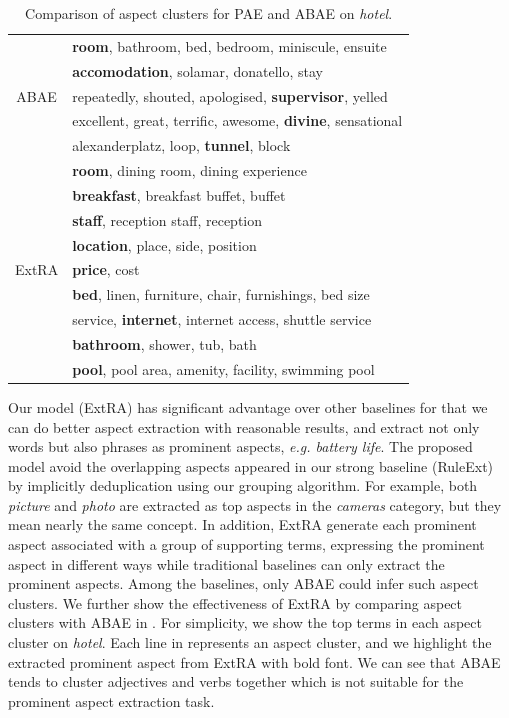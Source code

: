  
 \begin{table}[!th]
 	\small
 	\centering
 	\caption{Comparison of aspect clusters for PAE and ABAE on \textit{hotel}.}
 	\label{table:aspect_clusters}
 	\begin{tabular}{|c|l|}
 		\hline
 		\multirow{5}{*}{ABAE} & \textbf{room}, bathroom, bed, bedroom, miniscule, ensuite   \\
 		&  \textbf{accomodation}, solamar, donatello, stay   \\ 
 		&  repeatedly, shouted, apologised, \textbf{supervisor}, yelled   \\ 
 		&  excellent, great, terrific, awesome, \textbf{divine}, sensational  \\ 
 		&  alexanderplatz, loop, \textbf{tunnel}, block   \\  \cline{2-2}
 		\hline
 		\hline
 		\multirow{9}{*}{ExtRA} & \textbf{room}, dining room, dining experience   \\
 		&  \textbf{breakfast}, breakfast buffet, buffet \\ 
 		&  \textbf{staff}, reception staff, reception   \\ 
 		&  \textbf{location}, place, side, position   \\ 
 		&  \textbf{price}, cost   \\  
 		&  \textbf{bed}, linen, furniture, chair, furnishings, bed size \\
 		&  service, \textbf{internet}, internet access, shuttle service \\
 		&  \textbf{bathroom}, shower, tub, bath \\
 		&  \textbf{pool}, pool area, amenity, facility, swimming pool \\ \cline{2-2}
 		\hline
 	\end{tabular}
 \end{table}

Our model (ExtRA) has significant advantage over other baselines for that we can do better aspect extraction with reasonable results, and extract not only words but also phrases as prominent aspects, \textit{e.g. battery life}. 
The proposed model avoid the overlapping aspects appeared in our strong baseline 
(RuleExt) by implicitly deduplication using our grouping algorithm. 
For example, both \textit{picture} and \textit{photo} are extracted as top aspects in
the \textit{cameras} category, 
but they mean nearly the same concept. 
In addition, ExtRA generate each prominent aspect associated with
a group of supporting terms, expressing the prominent aspect in different ways
while traditional baselines can only extract the prominent aspects.
Among the baselines, only ABAE could infer such aspect clusters.
We further show the effectiveness of ExtRA by comparing
aspect clusters with ABAE in .
For simplicity, we show the top terms in each aspect cluster on \textit{hotel}.
Each line in  represents an aspect cluster, and
we highlight the extracted prominent aspect from ExtRA with bold font.
We can see that ABAE tends to cluster adjectives and verbs together
which is not suitable for the prominent aspect extraction task.

